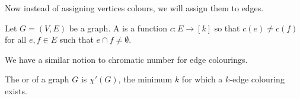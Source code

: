 Now instead of assigning vertices colours, we will assign them to edges. 

\begin{definition}
	Let $G = (V, E)$ be a graph. A  is a function $c:E \rightarrow [k]$ so that $c(e) \neq c(f)$ for all $e, f \in E$ such that $e \cap f \neq \emptyset.$
\end{definition}

We have a similar notion to chromatic number for edge colourings.

\begin{definition}
	The  or  of a graph $G$ is $\chi'(G)$, the minimum $k$ for which a $k$-edge colouring exists.
\end{definition}


